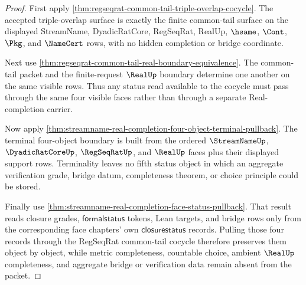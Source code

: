 \begin{proof}
First apply \autoref{thm:regseqrat-common-tail-triple-overlap-cocycle}. The accepted triple-overlap surface is exactly the finite common-tail surface on the displayed StreamName, DyadicRatCore, RegSeqRat, RealUp, $\hsame$, $\Cont$, $\Pkg$, and $\NameCert$ rows, with no hidden completion or bridge coordinate.

Next use \autoref{thm:regseqrat-common-tail-real-boundary-equivalence}. The common-tail packet and the finite-request $\RealUp$ boundary determine one another on the same visible rows. Thus any status read available to the cocycle must pass through the same four visible faces rather than through a separate Real-completion carrier.

Now apply \autoref{thm:streamname-real-completion-four-object-terminal-pullback}. The terminal four-object boundary is built from the ordered $\StreamNameUp$, $\DyadicRatCoreUp$, $\RegSeqRatUp$, and $\RealUp$ faces plus their displayed support rows. Terminality leaves no fifth status object in which an aggregate verification grade, bridge datum, completeness theorem, or choice principle could be stored.

Finally use \autoref{thm:streamname-real-completion-face-status-pullback}. That result reads closure grades, $\mathsf{formalstatus}$ tokens, Lean targets, and bridge rows only from the corresponding face chapters' own $\mathsf{closurestatus}$ records. Pulling those four records through the RegSeqRat common-tail cocycle therefore preserves them object by object, while metric completeness, countable choice, ambient $\RealUp$ completeness, and aggregate bridge or verification data remain absent from the packet.
\end{proof}

